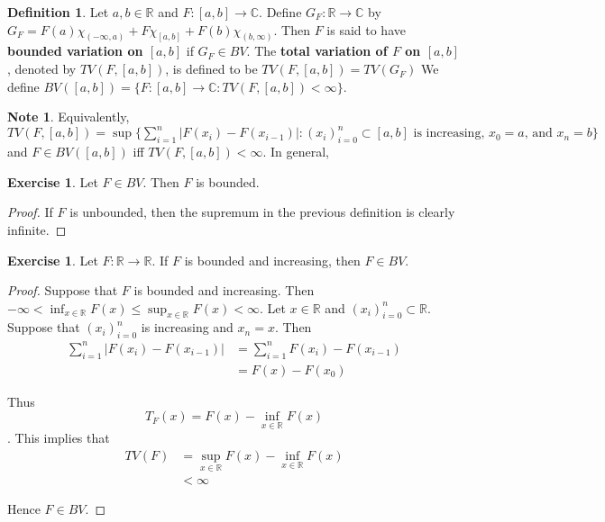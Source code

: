 \documentclass[12pt]{amsart}
\theoremstyle{definition}
\newtheorem{defn}[definition]{Definition}
\newtheorem{note}[definition]{Note}
\newtheorem{ex}[definition]{Exercise}
\newcommand{\C}{\mathbb{C}}
\newcommand{\R}{\mathbb{R}}
\begin{document}
	\begin{defn}
		Let $a,b \in \R$ and $F:[a,b] \rightarrow \C$. Define $G_F:\R \rightarrow \C$ by $G_F = F(a)\chi_{(-\infty,a)} + F\chi_{[a,b]}+F(b)\chi_{(b,\infty)}$. Then $F$ is said to have \textbf{bounded variation on $[a,b]$} if $G_F \in BV$. The \textbf{total variation of $F$ on $[a,b]$}, denoted by $TV(F, [a,b])$, is defined to be $TV(F, [a,b]) = TV(G_F)$ We define $BV([a,b]) = \{F:[a,b] \rightarrow \C: TV(F, [a,b]) < \infty\}$.
	\end{defn}
	
	\begin{note}
		Equivalently, $TV(F, [a,b]) = \sup \big \{\sum_{i=1}^{n}|F(x_{i}) - F(x_{i-1})|: (x_i)_{i=0}^n \subset [a,b] \text{ is increasing, } x_0=a \text{, and } x_n=b\big \}$ and $F \in BV([a,b])$ iff $TV(F, [a,b]) < \infty$. In general, 
	\end{note}
	
	\begin{ex}
		Let $F \in BV$. Then $F$ is bounded.
	\end{ex}
	
	\begin{proof}
		If $F$ is unbounded, then the supremum in the previous definition is clearly infinite.
	\end{proof}
	
	\begin{ex}
		Let $F:\R \rightarrow \R$. If $F$ is bounded and increasing, then $F \in BV$.
	\end{ex}
	
	\begin{proof}
		Suppose that $F$ is bounded and increasing. Then $-\infty<\inf_{x \in \R}F(x) \leq \sup_{x \in \R}F(x)<\infty$. Let $x \in \R$ and $(x_i)_{i=0}^n \subset \R$. Suppose that $(x_i)_{i=0}^n$ is increasing and $x_n=x$. Then 
		\begin{align*}
			\sum_{i=1}^n|F(x_i)-F(x_{i-1})| 
			&= \sum_{i=1}^n F(x_i)-F(x_{i-1})\\
			&= F(x)-F(x_0)
		\end{align*}
		
		Thus $$T_F(x) = F(x)-\inf_{x \in \R}F(x)$$. This implies that 
		\begin{align*}
			TV(F) 
			&= \sup_{x \in \R}F(x)-\inf_{x \in \R}F(x)\\
			&<\infty
		\end{align*}
		
		Hence $F \in BV$.
	\end{proof}
	
\end{document}
